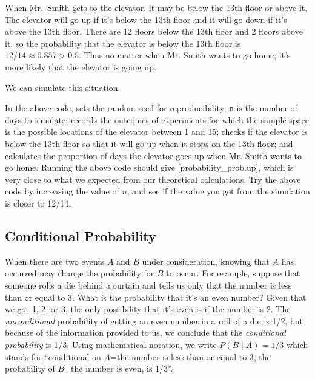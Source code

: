 When Mr.~Smith gets to the elevator, it may be below the 13th floor or above
it. The elevator will go up if it's below the 13th floor and it will go
down if it's above the 13th floor. There are 12 floors below the 13th floor and
2 floors above it, so the probability that the elevator is below the 13th floor
is $12/14\approx0.857>0.5$. Thus no matter when Mr. Smith wants to go home, it's
more likely that the elevator is going up.

We can simulate this situation:

In the above code,  sets the random seed for reproducibility;
 \lstinline{n} is the number of days to simulate;  records
the outcomes of experiments for which the sample space is the possible locations
of the elevator between 1 and 15;  checks if the elevator is below
the 13th floor so that it will go up when it stops on the 13th floor; and
 calculates the proportion of days the elevator goes up when
Mr. Smith wants to go home.
Running the above code should give
[probability_prob.up], which is very close to what we
expected from our theoretical calculations. Try the above code by increasing the
value of $n$, and see if the value you get from the simulation is closer to
12/14.

  
\subsection{Conditional Probability}\label{sec:conditional}

When there are two events $A$ and $B$ under consideration, knowing that $A$ has
occurred may change the probability for $B$ to occur. For example, suppose that
someone rolls a die behind a curtain and tells us only that the number is less
than or equal to 3. What is the probability that it's an even number? Given
that we got 1, 2, or 3, the only possibility that it's even is if the number is
2. The \emph{unconditional} probability of getting an even number in a roll of
a die is 1/2, but because of the information provided to us, we conclude
that the \emph{conditional probability} is 1/3.  Using mathematical notation,
we write  $P(B\mid A)=1/3$ which stands for ``conditional on $A$=the number is
less than or equal to 3, the probability of $B$=the number is even, is 1/3''. 

